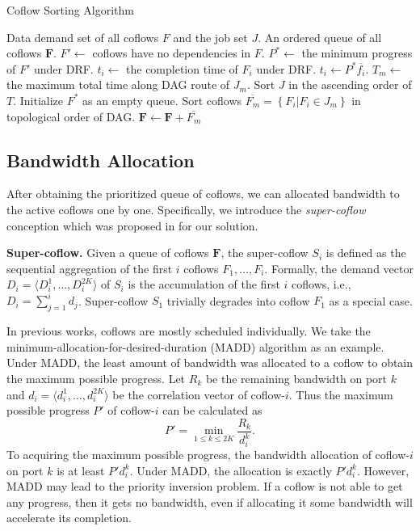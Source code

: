 \documentclass[10pt, conference, letterpaper]{IEEEtran}
\begin{document}
\begin{algorithm}
	\caption{Coflow Sorting Algorithm}
	\begin{algorithmic}[1]
		\Require Data demand set of all coflows $F$ and the job set $J$.
		\Ensure An ordered queue of all coflows $\mathbf{F}$. 
		\State $F' \gets $ coflows have no dependencies in $F$.
		\State $P^* \gets$ the minimum progress of $F'$ under DRF.
				\State $t_i \gets$ the completion time of $F_i$ under DRF.
			\Else
				\State $t_i \gets P^*\overline{f_i}$.
			\EndIf
		\EndFor
		\State $T_m \gets$ the maximum total time along DAG route of $J_m$.
		\State Sort $J$ in the ascending order of $T$.
		\State Initialize $F^*$ as an empty queue.
			\State Sort coflows $\overline{F_m} = \left\{F_i|F_i \in J_m\right\}$ in topological order of DAG.
			\State $\mathbf{F} \gets \mathbf{F} + \overline{F_m}$
		\EndFor
	\end{algorithmic}
\end{algorithm}

\subsection{Bandwidth Allocation}
After obtaining the prioritized queue of coflows, we can allocated bandwidth to the active coflows one by one. Specifically, we introduce the \emph{super-coflow} conception which was proposed in \cite{utopia} for our solution.

\noindent \textbf{Super-coflow.} Given a queue of coflows $\mathbf{F}$, the super-coflow $S_i$ is defined as the sequential aggregation of the first $i$ coflows $F_1,\dots,F_i$. Formally, the demand vector $D_i = \langle D_i^1,\dots,D_i^{2K} \rangle$ of $S_i$ is the accumulation of the first $i$ coflows, i.e., $D_i = \sum_{j=1}^id_j$. Super-coflow $S_1$ trivially degrades into coflow $F_1$ as a special case.

In previous works, coflows are mostly scheduled individually. We take the minimum-allocation-for-desired-duration (MADD) algorithm as an example\cite{varys}. Under MADD, the least amount of bandwidth was allocated to a coflow to obtain the maximum possible progress. Let $R_k$ be the remaining bandwidth on port $k$ and $d_i=\langle d_i^1,\dots,d_i^{2K}\rangle$ be the correlation vector of coflow-$i$. Thus the maximum possible progress $P'$ of coflow-$i$ can be calculated as
\begin{equation}
	P' = \min_{1\leq k \leq 2K}\frac{R_k}{d_i^k}.
\end{equation}
To acquiring the maximum possible progress, the bandwidth allocation of coflow-$i$ on port $k$ is at least $P'd_i^k$. Under MADD, the allocation is exactly $P'd_i^k$. However, MADD may lead to the priority inversion problem. If a coflow is not able to get any progress, then it gets no bandwidth, even if allocating it some bandwidth will accelerate its completion.
\end{document}
